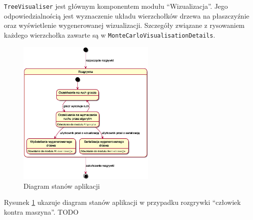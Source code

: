 \documentclass{article}
\newcommand{\code}[1]{\colorbox{light-gray}{\texttt{#1}}}
\begin{document}
	\noindent \code{TreeVisualiser} jest głównym komponentem modułu ``Wizualizacja''. Jego odpowiedzialnością jest wyznaczenie układu wierzchołków drzewa na płaszczyźnie oraz wyświetlenie wygenerowanej wizualizacji. Szczegóły związane z rysowaniem każdego wierzchołka zawarte są w \code{MonteCarloVisualisationDetails}.
	
	\clearpage
	
	\begin{figure}[h]
		\centering
		\includegraphics[width=0.6\textwidth]{statediagram}
		\caption{Diagram stanów aplikacji}
		\label{rys:statediagram}
	\end{figure}

	\noindent Rysunek \ref{rys:statediagram} ukazuje diagram stanów aplikacji w przypadku rozgrywki ``człowiek kontra maszyna''. TODO
	
	
\end{document}
